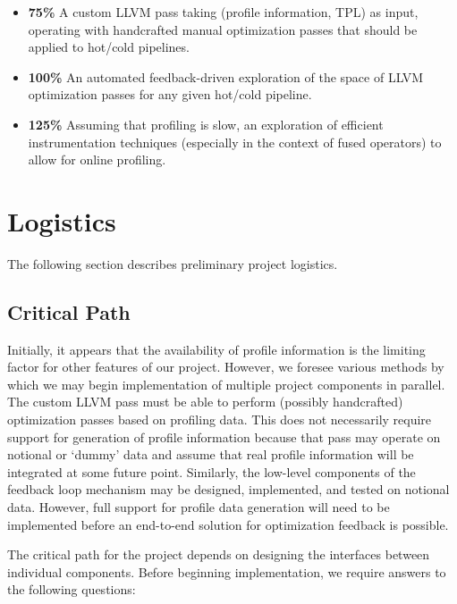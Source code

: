 \documentclass{vldb}
\begin{document}
\begin{itemize}
    \item \textbf{75\%} A custom LLVM pass taking (profile information, TPL) as input, operating with handcrafted manual optimization passes that should be applied to hot/cold pipelines.
    \item \textbf{100\%} An automated feedback-driven exploration of the space of LLVM optimization passes for any given hot/cold pipeline.
    \item \textbf{125\%} Assuming that profiling is slow, an exploration of efficient instrumentation techniques (especially in the context of fused operators) to allow for online profiling.
\end{itemize}


\section{Logistics}

The following section describes preliminary project logistics.

\subsection{Critical Path}

Initially, it appears that the availability of profile information is the limiting factor for other features of our project. However, we foresee various methods by which we may begin implementation of multiple project components in parallel. The custom LLVM pass must be able to perform (possibly handcrafted) optimization passes based on profiling data. This does not necessarily require support for generation of profile information because that pass may operate on notional or `dummy' data and assume that real profile information will be integrated at some future point. Similarly, the low-level components of the feedback loop mechanism may be designed, implemented, and tested on notional data. However, full support for profile data generation will need to be implemented before an end-to-end solution for optimization feedback is possible.

The critical path for the project depends on designing the interfaces between individual components. Before beginning implementation, we require answers to the following questions:
\end{document}
